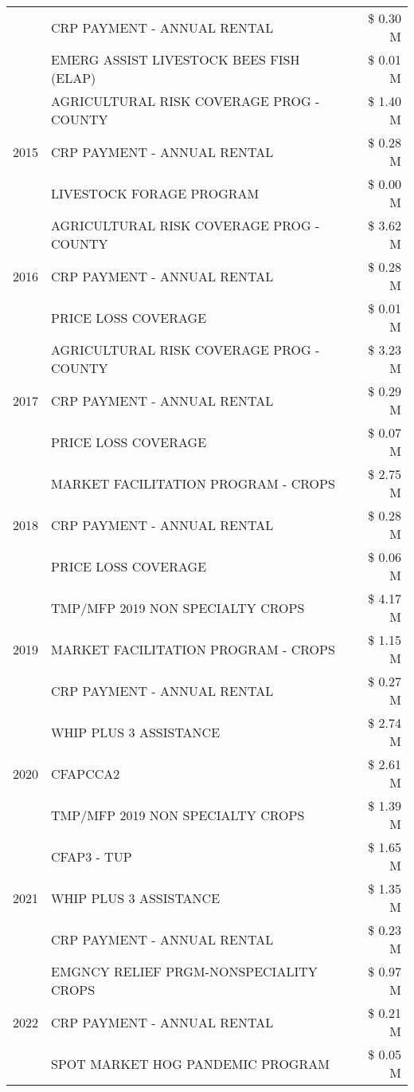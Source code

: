 \begin{tabular}{llr}
 & CRP PAYMENT - ANNUAL RENTAL & \$ 0.30 M \\
 & EMERG ASSIST LIVESTOCK BEES FISH (ELAP) & \$ 0.01 M \\
\cline{1-3}
\multirow[t]{3}{*}{2015} & AGRICULTURAL RISK COVERAGE PROG - COUNTY & \$ 1.40 M \\
 & CRP PAYMENT - ANNUAL RENTAL & \$ 0.28 M \\
 & LIVESTOCK FORAGE PROGRAM & \$ 0.00 M \\
\cline{1-3}
\multirow[t]{3}{*}{2016} & AGRICULTURAL RISK COVERAGE PROG - COUNTY & \$ 3.62 M \\
 & CRP PAYMENT - ANNUAL RENTAL & \$ 0.28 M \\
 & PRICE LOSS COVERAGE & \$ 0.01 M \\
\cline{1-3}
\multirow[t]{3}{*}{2017} & AGRICULTURAL RISK COVERAGE PROG - COUNTY & \$ 3.23 M \\
 & CRP PAYMENT - ANNUAL RENTAL & \$ 0.29 M \\
 & PRICE LOSS COVERAGE & \$ 0.07 M \\
\cline{1-3}
\multirow[t]{3}{*}{2018} & MARKET FACILITATION PROGRAM - CROPS & \$ 2.75 M \\
 & CRP PAYMENT - ANNUAL RENTAL & \$ 0.28 M \\
 & PRICE LOSS COVERAGE & \$ 0.06 M \\
\cline{1-3}
\multirow[t]{3}{*}{2019} & TMP/MFP 2019 NON SPECIALTY CROPS & \$ 4.17 M \\
 & MARKET FACILITATION PROGRAM - CROPS & \$ 1.15 M \\
 & CRP PAYMENT - ANNUAL RENTAL & \$ 0.27 M \\
\cline{1-3}
\multirow[t]{3}{*}{2020} & WHIP PLUS 3 ASSISTANCE & \$ 2.74 M \\
 & CFAPCCA2 & \$ 2.61 M \\
 & TMP/MFP 2019 NON SPECIALTY CROPS & \$ 1.39 M \\
\cline{1-3}
\multirow[t]{3}{*}{2021} & CFAP3 - TUP & \$ 1.65 M \\
 & WHIP PLUS 3 ASSISTANCE & \$ 1.35 M \\
 & CRP PAYMENT - ANNUAL RENTAL & \$ 0.23 M \\
\cline{1-3}
\multirow[t]{3}{*}{2022} & EMGNCY RELIEF PRGM-NONSPECIALITY CROPS & \$ 0.97 M \\
 & CRP PAYMENT - ANNUAL RENTAL & \$ 0.21 M \\
 & SPOT MARKET HOG PANDEMIC PROGRAM & \$ 0.05 M \\
\cline{1-3}
\bottomrule
\end{tabular}
